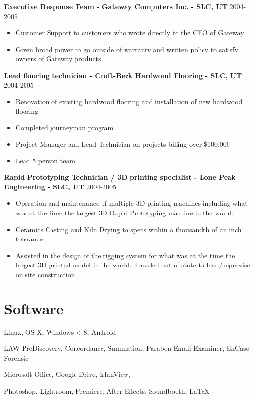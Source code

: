 \documentclass[line,margin]{res}
\begin{document}
\begin{resume}
{\bf Executive Response Team - Gateway Computers Inc. - SLC, UT} \hfill 2004-2005\\
  \begin{itemize} \itemsep -2pt
  \item Customer Support to customers who wrote directly to the CEO of Gateway
  \item Given broad power to go outside of warranty and written policy to satisfy owners of Gateway products
  \end{itemize} 	
{\bf Lead flooring technician - Croft-Beck Hardwood Flooring - SLC, UT} \hfill 2004-2005\\
  \begin{itemize} \itemsep -2pt
  \item Renovation of existing hardwood flooring and installation of new hardwood flooring
  \item Completed journeyman program
  \item Project Manager and Lead Technician on projects billing over \$100,000
  \item Lead 5 person team
  \end{itemize} 	
 {\bf Rapid Prototyping Technician / 3D printing specialist - Lone Peak Engineering - SLC, UT} \hfill 2004-2005\\
  \begin{itemize} \itemsep -2pt
  \item Operation and maintenance of multiple 3D printing machines including what was at the time the largest 3D Rapid Prototyping machine in the world. 
  \item Ceramics Casting and Kiln Drying to specs within a thousandth of an inch tolerance 
  \item Assisted in the design of the rigging system for what was at the time the largest 3D printed model in the world. Traveled out of state to lead/supervise on site construction
  \end{itemize} 	
\section{Software}
 \begin{description} \itemsep -2pt
 \item[Operating Systems:] Linux, OS X, Windows < 8, Android
 \item[EDD Specfic:] LAW PreDiscovery, Concordance, Summation, Paraben Email Examiner, EnCase Forensic
 \item[General:] Microsoft Office, Google Drive, IrfanView, 
 \item[Design:] Photoshop, Lightroom, Premiere, After Effects, Soundbooth, \LaTeX
 \end{description}

\end{resume}
\end{document}
